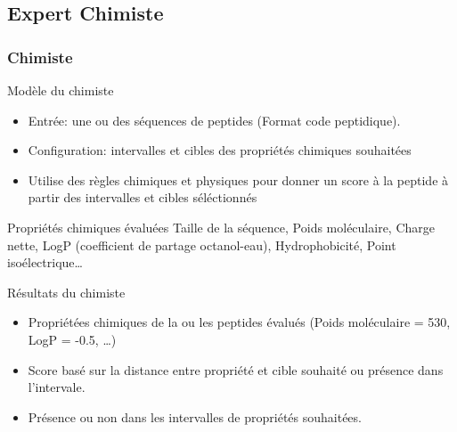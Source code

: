 \subsection{Expert Chimiste}
\begin{frame}
    \frametitle{Chimiste}
    \begin{block}{Modèle du chimiste}
        \begin{itemize}
        \item Entrée: une ou des séquences de peptides (Format code peptidique).
        \item Configuration: intervalles et cibles des propriétés chimiques souhaitées 
        \item Utilise des règles chimiques et physiques pour donner un score à la peptide à partir des intervalles et cibles séléctionnés
        \end{itemize}
    \end{block}
    \begin{block}{Propriétés chimiques évaluées}
            Taille de la séquence, Poids moléculaire, Charge nette, LogP (coefficient de partage octanol-eau), Hydrophobicité, Point isoélectrique\dots
    \end{block}
    \begin{block}{Résultats du chimiste}
        \begin{itemize}
        \item Propriétées chimiques de la ou les peptides évalués (Poids moléculaire = 530, LogP = -0.5, \dots)
        \item Score basé sur la distance entre propriété et cible souhaité ou présence dans l'intervale.
        \item Présence ou non dans les intervalles de propriétés souhaitées.
    \end{itemize}
    \end{block}
\end{frame}